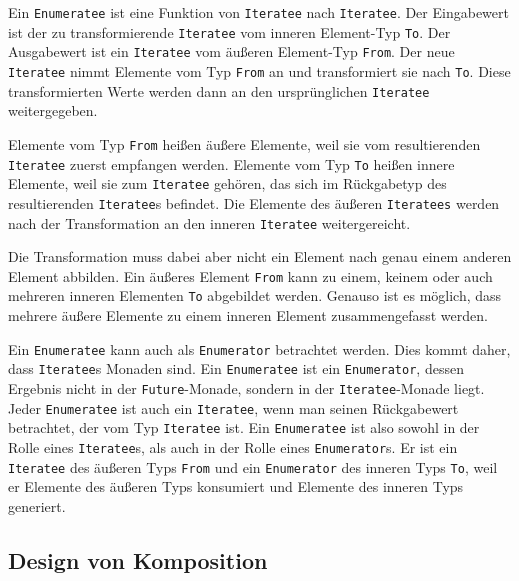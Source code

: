 Ein \lstinline|Enumeratee| ist eine Funktion von \lstinline|Iteratee| nach \lstinline|Iteratee|.
Der Eingabewert ist der zu transformierende \lstinline|Iteratee| vom inneren Element-Typ \lstinline|To|.
Der Ausgabewert ist ein \lstinline|Iteratee| vom äußeren Element-Typ \lstinline|From|.
Der neue \lstinline|Iteratee| nimmt Elemente vom Typ \lstinline|From| an und transformiert sie nach \lstinline|To|.
Diese transformierten Werte werden dann an den ursprünglichen \lstinline|Iteratee| weitergegeben.

Elemente vom Typ \lstinline|From| heißen äußere Elemente, weil sie vom resultierenden \lstinline|Iteratee| zuerst empfangen werden.
Elemente vom Typ \lstinline|To| heißen innere Elemente, weil sie zum \lstinline|Iteratee| gehören, das sich im Rückgabetyp des resultierenden \lstinline|Iteratee|s befindet.
Die Elemente des äußeren \lstinline|Iteratees| werden nach der Transformation an den inneren \lstinline|Iteratee| weitergereicht.

Die Transformation muss dabei aber nicht ein Element nach genau einem anderen Element abbilden.
Ein äußeres Element \lstinline|From| kann zu einem, keinem oder auch mehreren inneren Elementen \lstinline|To| abgebildet werden.
Genauso ist es möglich, dass mehrere äußere Elemente zu einem inneren Element zusammengefasst werden.

\begin{sloppypar} %
Ein \lstinline|Enumeratee| kann auch als \lstinline|Enumerator| betrachtet werden.
Dies kommt daher, dass \lstinline|Iteratee|s Monaden sind.
Ein \lstinline|Enumeratee| ist ein \lstinline|Enumerator|, dessen Ergebnis nicht in der \lstinline|Future|-Monade, sondern in der \lstinline|Iteratee|-Monade liegt.
Jeder \lstinline|Enumeratee| ist auch ein \lstinline|Iteratee|, wenn man seinen Rückgabewert betrachtet, der vom Typ \lstinline|Iteratee| ist.
Ein \lstinline|Enumeratee| ist also sowohl in der Rolle eines \lstinline|Iteratee|s, als auch in der Rolle eines \lstinline|Enumerator|s.
Er ist ein \lstinline|Iteratee| des äußeren Typs \lstinline|From| und ein \lstinline|Enumerator| des inneren Typs \lstinline|To|, weil er Elemente des äußeren Typs konsumiert und Elemente des inneren Typs generiert.
\end{sloppypar}



\subsection{Design von Komposition} %
\label{sub:komposition}

